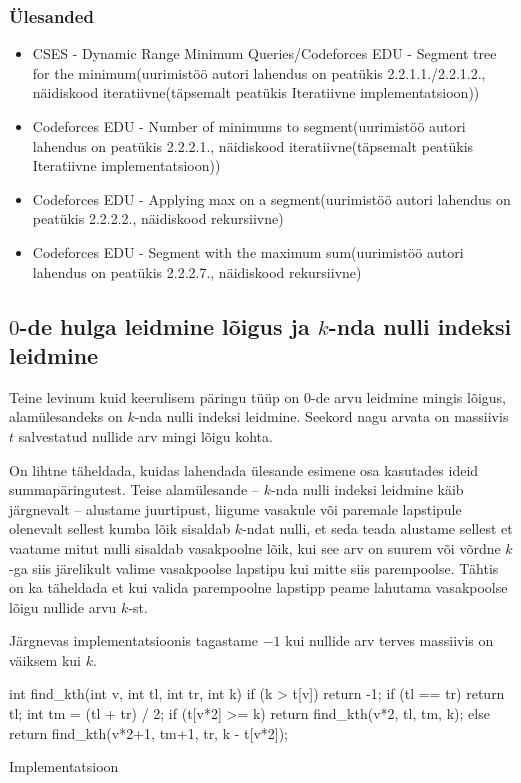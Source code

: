 \documentclass{trkut}
\theoremstyle{definition}
\begin{document}
\subsubsection{Ülesanded}
\begin{itemize}
    \item CSES - Dynamic Range Minimum Queries/Codeforces EDU - Segment tree for the minimum(uurimistöö autori lahendus on peatükis 2.2.1.1./2.2.1.2., näidiskood iteratiivne(täpsemalt peatükis Iteratiivne implementatsioon))
    \item Codeforces EDU - Number of minimums to segment(uurimistöö autori lahendus on peatükis 2.2.2.1., näidiskood iteratiivne(täpsemalt peatükis Iteratiivne implementatsioon))
    \item Codeforces EDU - Applying max on a segment(uurimistöö autori lahendus on peatükis 2.2.2.2., näidiskood rekursiivne)
    \item Codeforces EDU - Segment with the maximum sum(uurimistöö autori lahendus on peatükis 2.2.2.7., näidiskood rekursiivne)
\end{itemize}

\subsection{$0$-de hulga leidmine lõigus ja $k$-nda nulli indeksi leidmine}

Teine levinum kuid keerulisem päringu tüüp on $0$-de arvu leidmine mingis lõigus, alamülesandeks on $k$-nda nulli indeksi leidmine.
Seekord nagu arvata on massiivis $t$ salvestatud nullide arv mingi lõigu kohta. \parencite{EMaxx}

On lihtne täheldada, kuidas lahendada ülesande esimene osa kasutades ideid summapäringutest. Teise alamülesande -- $k$-nda nulli indeksi leidmine käib järgnevalt -- alustame juurtipust, liigume vasakule või paremale lapstipule olenevalt sellest kumba lõik sisaldab $k$-ndat nulli, et seda teada alustame sellest et vaatame mitut nulli sisaldab vasakpoolne lõik, kui see arv on suurem või võrdne $k$-ga siis järelikult valime vasakpoolse lapstipu kui mitte siis parempoolse. Tähtis on ka täheldada et kui valida parempoolne lapstipp peame lahutama vasakpoolse lõigu nullide arvu $k$-st. \parencite{EMaxx}

Järgnevas implementatsioonis tagastame $-1$ kui nullide arv terves massiivis on väiksem kui $k$. \parencite{EMaxx}
\begin{cclol}
int find_kth(int v, int tl, int tr, int k) {
    if (k > t[v])
        return -1;
    if (tl == tr)
        return tl;
    int tm = (tl + tr) / 2;
    if (t[v*2] >= k)
        return find_kth(v*2, tl, tm, k);
    else 
        return find_kth(v*2+1, tm+1, tr, k - t[v*2]);
}
\end{cclol}
 \begin{kk}[H]%
    \caption{Implementatsioon}%
    \label{EMaxx}%
    \end{kk}
\end{document}
